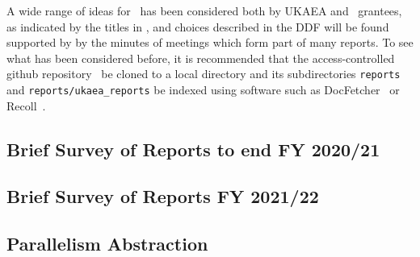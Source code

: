 A wide range of ideas for \nep \ has been considered both by UKAEA and \nep \ grantees,
as indicated by the titles in , and choices described in the DDF
will be found supported by by the minutes of meetings which form
part of many reports. To see what has been considered before, it is recommended that 
the access-controlled github repository~\cite{xpndocswebsite} be cloned to a
local directory and its subdirectories {\tt reports} and {\tt reports/ukaea\_reports}
be indexed using software such as DocFetcher~\cite{docfetcherwebsite} or Recoll~\cite{recollwebsite}.


\subsection{Brief Survey of Reports to end FY 2020/21}\label{sec:summary}

\subsection{Brief Survey of Reports FY 2021/22}\label{sec:summary22}


 
\subsection{Parallelism Abstraction}\label{sec:parabstr}


